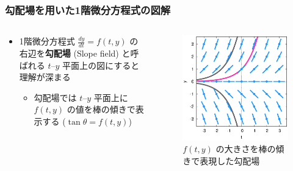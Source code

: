 \documentclass[dvipdfmx,aspectratio=169,20pt]{beamer}
\newcommand{\myfontsetting}[3]{{\fontsize{#1}{#2}\selectfont #3}}
\begin{document}
\begin{frame}
\frametitle{\myfontsetting{24pt}{24pt}{勾配場を用いた1階微分方程式の図解}}
\begin{columns}[t]
\begin{column}{0.48\textwidth} 
\vspace{-7mm}
\begin{itemize}
    \setlength{\itemsep}{0.25cm}
    \item 
    \myfontsetting{15pt}{17pt}{
    1階微分方程式 $\frac{dy}{dt}=f(t,y)$ の右辺を{\bf 勾配場} (Slope field) と呼ばれる $t$--$y$ 平面上の図にすると理解が深まる
    }
    \begin{itemize}
        \item 
        \myfontsetting{10pt}{10pt}{
        勾配場では $t$--$y$ 平面上に $f(t,y)$ の値を棒の傾きで表示する
        ($\tan \theta = f(t,y)$)
        }
    \end{itemize}
\end{itemize}
\end{column}
\begin{column}{0.52\textwidth} 
\begin{figure}[h]
	\begin{center}
\vspace{-10mm}
    	\includegraphics[width=1.0\textwidth]{fig12-1_differential_equation_example.eps}
	\end{center}
	\vspace{-5mm}
	\caption{\myfontsetting{10pt}{10pt}{$f(t,y)$ の大きさを棒の傾きで表現した勾配場}}
\end{figure}
\end{column}
\end{columns}
\end{frame}
\end{document}
